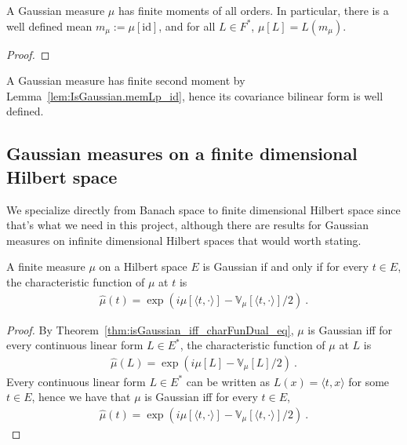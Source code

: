 \begin{lemma}\label{lem:IsGaussian.memLp_id}
  \mathlibok
A Gaussian measure $\mu$ has finite moments of all orders.
In particular, there is a well defined mean $m_\mu := \mu[\mathrm{id}]$, and for all $L \in F^*$, $\mu[L] = L(m_\mu)$.
\end{lemma}

\begin{proof}\leanok

\end{proof}

A Gaussian measure has finite second moment by Lemma~\ref{lem:IsGaussian.memLp_id}, hence its covariance bilinear form is well defined.


\subsection{Gaussian measures on a finite dimensional Hilbert space}

We specialize directly from Banach space to finite dimensional Hilbert space since that's what we need in this project, although there are results for Gaussian measures on infinite dimensional Hilbert spaces that would worth stating.

\begin{lemma}\label{lem:isGaussian_iff_charFun_eq}
  \leanok
A finite measure $\mu$ on a Hilbert space $E$ is Gaussian if and only if for every $t \in E$, the characteristic function of $\mu$ at $t$ is
\begin{align*}
  \hat{\mu}(t) =  \exp\left(i \mu[\langle t, \cdot \rangle] - \mathbb{V}_\mu[\langle t, \cdot \rangle] / 2\right) \: .
\end{align*}
\end{lemma}

\begin{proof}\leanok
By Theorem~\ref{thm:isGaussian_iff_charFunDual_eq}, $\mu$ is Gaussian iff for every continuous linear form $L \in E^*$, the characteristic function of $\mu$ at $L$ is
\begin{align*}
  \hat{\mu}(L) = \exp\left(i \mu[L] - \mathbb{V}_\mu[L] / 2\right) \: .
\end{align*}
Every continuous linear form $L \in E^*$ can be written as $L(x) = \langle t, x \rangle$ for some $t \in E$, hence we have that $\mu$ is Gaussian iff for every $t \in E$,
\begin{align*}
  \hat{\mu}(t) = \exp\left(i \mu[\langle t, \cdot \rangle] - \mathbb{V}_\mu[\langle t, \cdot \rangle] / 2\right) \: .
\end{align*}
\end{proof}

